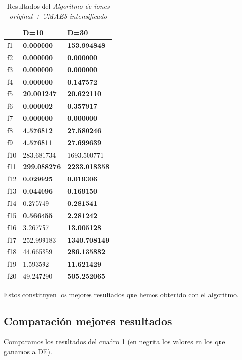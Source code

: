 \documentclass[a4paper,11pt]{article}
\begin{document}
\begin{itemize}
  \begin{table}[H]	
  \caption{Resultados del \textit{Algoritmo de iones original + CMAES intensificado}}
  \centering
  \begin{tabular}{|l|l|l|}
  \hline
  & \textbf{D=10} & \textbf{D=30} \\ \hline
  f1 &  \textbf{0.000000} &  \textbf{153.994848} \\ \hline
  f2 &  \textbf{0.000000} &  \textbf{0.000000} \\ \hline
  f3 &  \textbf{0.000000} &  \textbf{0.000000} \\ \hline
  f4 &  \textbf{0.000000} &  \textbf{0.147572} \\ \hline
  f5 &  \textbf{20.001247} &  \textbf{20.622110} \\ \hline
  f6 &  \textbf{0.000002} &  \textbf{0.357917} \\ \hline
  f7 &  \textbf{0.000000} &  \textbf{0.000000} \\ \hline
  f8 &  \textbf{4.576812} &  \textbf{27.580246} \\ \hline
  f9 &  \textbf{4.576811} &  \textbf{27.699639} \\ \hline
  f10 &  283.681734 &  1693.500771 \\ \hline
  f11 &  \textbf{299.088276} &  \textbf{2233.018358} \\ \hline
  f12 &  \textbf{0.029925} &  \textbf{0.019306} \\ \hline
  f13 &  \textbf{0.044096} &  \textbf{0.169150} \\ \hline
  f14 &  0.275749 &  \textbf{0.281541} \\ \hline
  f15 &  \textbf{0.566455} &  \textbf{2.281242} \\ \hline
  f16 &  3.267757 &  \textbf{13.005128} \\ \hline
  f17 &  252.999183 &  \textbf{1340.708149} \\ \hline
  f18 &  44.665859 &  \textbf{286.135882} \\ \hline
  f19 &  1.593592 &  \textbf{11.621429} \\ \hline
  f20 &  49.247290 &  \textbf{505.252065} \\ \hline
  \end{tabular}
  \label{bestres}
  \end{table}
  
  Estos constituyen los mejores resultados que hemos obtenido con el algoritmo.
  
  \subsection{Comparación mejores resultados}
  Comparamos los resultados del cuadro \ref{bestres} (en negrita los valores en los que ganamos a DE).

\end{itemize}
\end{document}

